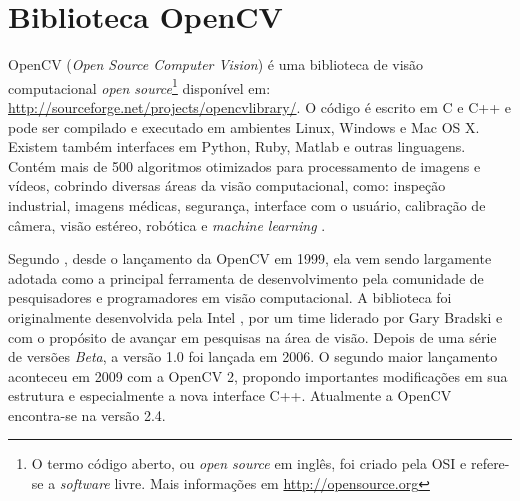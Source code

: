 





\section{Biblioteca OpenCV} %
\label{sec:biblioteca_opencv}

OpenCV (\textit{Open Source Computer Vision}) \citep{opencv_library} é uma biblioteca de visão computacional \textit{open source}\footnote{O termo código aberto, ou \textit{open source} em inglês, foi criado pela OSI e refere-se a \textit{software} livre. Mais informações em \url{http://opensource.org}} disponível em: \url{http://sourceforge.net/projects/opencvlibrary/}. O código é escrito em C e C++ e pode ser compilado e executado em ambientes Linux, Windows e Mac OS X. Existem também interfaces em Python, Ruby, Matlab e outras linguagens. Contém mais de 500 algoritmos otimizados para processamento de imagens e vídeos, cobrindo diversas áreas da visão computacional, como: inspeção industrial, imagens médicas, segurança, interface com o usuário, calibração de câmera, visão estéreo, robótica e \textit{machine learning} \citep{opencv:2008:book}.

Segundo \cite{opencv2:2011:book}, desde o lançamento da OpenCV em 1999, ela vem sendo largamente adotada como a principal ferramenta de desenvolvimento pela comunidade de pesquisadores e programadores em visão computacional. A biblioteca foi originalmente desenvolvida pela Intel \citep{intel:2013:online}, por um time liderado por Gary Bradski e com o propósito de avançar em pesquisas na área de visão. Depois de uma série de versões \textit{Beta}, a versão 1.0 foi lançada em 2006. O segundo maior lançamento aconteceu em 2009 com a OpenCV 2, propondo importantes modificações em sua estrutura e especialmente a nova interface C++. Atualmente a OpenCV encontra-se na versão 2.4.

